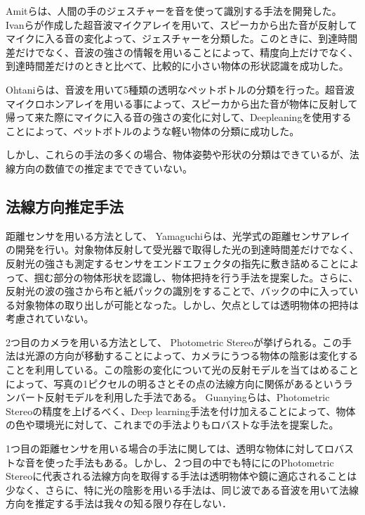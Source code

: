 Amitら\cite{amit2017gesture}は、人間の手のジェスチャーを音を使って識別する手法を開発した。Ivanら\cite{ivan2014ultrasoundimaging}が作成した超音波マイクアレイを用いて、スピーカから出た音が反射してマイクに入る音の変化よって、ジェスチャーを分類した。このときに、到達時間差だけでなく、音波の強さの情報を用いることによって、精度向上だけでなく、到達時間差だけのときと比べて、比較的に小さい物体の形状認識を成功した。

Ohtaniら\cite{ohtani2007transparentsound}は、音波を用いて5種類の透明なペットボトルの分類を行った。超音波マイクロホンアレイを用いる事によって、スピーカから出た音が物体に反射して帰って来た際にマイクに入る音の強さの変化に対して、Deepleaningを使用することによって、ペットボトルのような軽い物体の分類に成功した。

しかし、これらの手法の多くの場合、物体姿勢や形状の分類はできているが、法線方向の数値での推定までできていない。

\subsection{法線方向推定手法}
\label{sec:related_work_surface}
距離センサを用いる方法として、
Yamaguchiら\cite{yamaguchi2019robotproximity}は、光学式の距離センサアレイの開発を行い。対象物体反射して受光器で取得した光の到達時間差だけでなく、反射光の強さも測定するセンサをエンドエフェクタの指先に敷き詰めることによって、掴む部分の物体形状を認識し、物体把持を行う手法を提案した。さらに、反射光の波の強さから布と紙パックの識別をすることで、バックの中に入っている対象物体の取り出しが可能となった。しかし、欠点としては透明物体の把持は考慮されていない。

2つ目のカメラを用いる方法として、
Photometric Stereoが挙げられる。この手法は光源の方向が移動することによって、カメラにうつる物体の陰影は変化することを利用している。この陰影の変化について光の反射モデルを当てはめることによって、写真の1ピクセルの明るさとその点の法線方向に関係があるというランバート反射モデル\cite{micheal1994diffusereflection}を利用した手法である。
Guanyingら\cite{guanying2019photometric}は、Photometric　 Stereoの精度を上げるべく、Deep learning手法を付け加えることによって、物体の色や環境光に対して、これまでの手法よりもロバストな手法を提案した。

1つ目の距離センサを用いる場合の手法に関しては、透明な物体に対してロバストな音を使った手法もある。しかし、２つ目の中でも特ににのPhotometric Stereoに代表される法線方向を取得する手法は透明物体や鏡に適応されることは少なく、さらに、特に光の陰影を用いる手法は、同じ波である音波を用いて法線方向を推定する手法は我々の知る限り存在しない．


